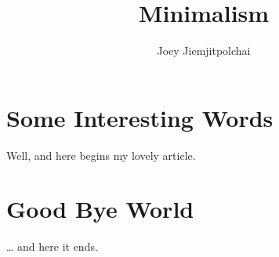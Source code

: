 \documentclass[a4paper, 11pt]{article}
\author{Joey Jiemjitpolchai}
\title{Minimalism}
\begin{document}
\maketitle
\tableofcontents
\section{Some Interesting Words}
Well, and here begins my lovely article.
\section{Good Bye World}
\ldots{} and here it ends.
\end{document}
